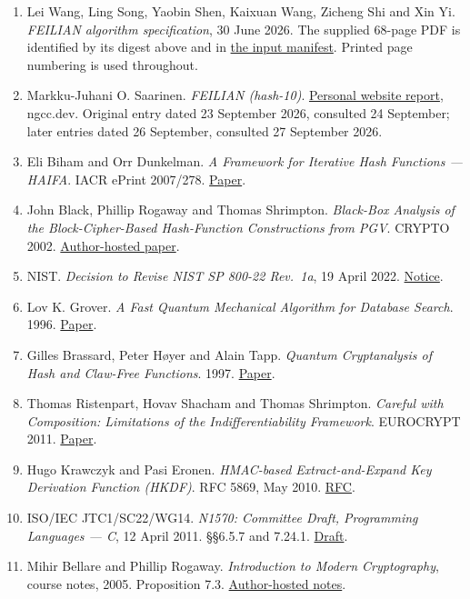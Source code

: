 \documentclass[
  english,
  11pt,
  a4paper,
]{article}
\begin{document}
\begin{enumerate}
\def\labelenumi{\arabic{enumi}.}
\item
  Lei Wang, Ling Song, Yaobin Shen, Kaixuan Wang, Zicheng Shi and Xin
  Yi. \emph{FEILIAN algorithm specification}, 30 June 2026. The supplied
  68-page PDF is identified by its digest above and in
  \href{data/input_manifest.json}{the input manifest}. Printed page
  numbering is used throughout.
\item
  Markku-Juhani O. Saarinen. \emph{FEILIAN (hash-10)}.
  \href{https://ngcc.dev/reports/hash-10.html}{Personal website report},
  ngcc.dev. Original entry dated 23 September 2026, consulted 24
  September; later entries dated 26 September, consulted 27 September
  2026.
\item
  Eli Biham and Orr Dunkelman. \emph{A Framework for Iterative Hash
  Functions --- HAIFA}. IACR ePrint 2007/278.
  \href{https://eprint.iacr.org/2007/278.pdf}{Paper}.
\item
  John Black, Phillip Rogaway and Thomas Shrimpton. \emph{Black-Box
  Analysis of the Block-Cipher-Based Hash-Function Constructions from
  PGV}. CRYPTO 2002.
  \href{https://www.cs.ucdavis.edu/~rogaway/papers/hash.pdf}{Author-hosted
  paper}.
\item
  NIST. \emph{Decision to Revise NIST SP 800-22 Rev.~1a}, 19 April 2022.
  \href{https://www.nist.gov/news-events/news/2022/04/decision-revise-nist-sp-800-22-rev-1a}{Notice}.
\item
  Lov K. Grover. \emph{A Fast Quantum Mechanical Algorithm for Database
  Search}. 1996. \href{https://arxiv.org/abs/quant-ph/9605043}{Paper}.
\item
  Gilles Brassard, Peter Høyer and Alain Tapp. \emph{Quantum
  Cryptanalysis of Hash and Claw-Free Functions}. 1997.
  \href{https://arxiv.org/abs/quant-ph/9705002}{Paper}.
\item
  Thomas Ristenpart, Hovav Shacham and Thomas Shrimpton. \emph{Careful
  with Composition: Limitations of the Indifferentiability Framework}.
  EUROCRYPT 2011. \href{https://eprint.iacr.org/2011/339.pdf}{Paper}.
\item
  Hugo Krawczyk and Pasi Eronen. \emph{HMAC-based Extract-and-Expand Key
  Derivation Function (HKDF)}. RFC 5869, May 2010.
  \href{https://www.rfc-editor.org/rfc/rfc5869.html}{RFC}.
\item
  ISO/IEC JTC1/SC22/WG14. \emph{N1570: Committee Draft, Programming
  Languages --- C}, 12 April 2011. §§6.5.7 and 7.24.1.
  \href{https://www.open-std.org/jtc1/sc22/wg14/www/docs/n1570.pdf}{Draft}.
\item
  Mihir Bellare and Phillip Rogaway. \emph{Introduction to Modern
  Cryptography}, course notes, 2005. Proposition 7.3.
  \href{https://www.cs.ucdavis.edu/~rogaway/classes/227/spring05/book/main.pdf\#page=167}{Author-hosted
  notes}.
\end{enumerate}
\end{document}
